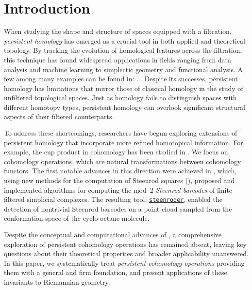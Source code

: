 
\section{Introduction} \label{s:introduction}

When studying the shape and structure of spaces equipped with a filtration, \textit{persistent homology} has emerged as a crucial tool in both applied and theoretical topology.
By tracking the evolution of homological features across the filtration, this technique has found widespread applications in fields ranging from data analysis and machine learning to simplectic geometry and functional analysis.
A few among many examples can be found in: ...
Despite its successes, persistent homology has limitations that mirror those of classical homology in the study of unfiltered topological spaces.
Just as homology fails to distinguish spaces with different homotopy types, persistent homology can overlook significant structural aspects of their filtered counterparts.

To address these shortcomings, researchers have begun exploring extensions of persistent homology that incorporate more refined homotopical information.
For example, the cup product in cohomology has been studied in \cite{contessoto_et_al:LIPIcs.SoCG.2022.31, memoli2024persistent, huang2005cup, yarmola2010persistence, herscovich2018higher, belchi2021a, contreras2022persistent}.
We focus on cohomology operations, which are natural transformations between cohomology functors.
The first notable advances in this direction were achieved in \cite{medina2022per_st}, which, using new methods for the computation of Steenrod squares (\cite{medina2023fast_sq}), proposed and implemented algorithms for computing the mod~2 \textit{Steenrod barcodes} of finite filtered simplicial complexes.
The resulting tool, \href{https://steenroder.github.io/steenroder/}{\texttt{steenroder}}, enabled the detection of nontrivial Steenrod barcodes on a point cloud sampled from the conformation space of the cyclo-octane molecule.

Despite the conceptual and computational advances of \cite{medina2022per_st}, a comprehensive exploration of persistent cohomology operations has remained absent, leaving key questions about their theoretical properties and broader applicability unanswered.
In this paper, we systematically treat \textit{persistent cohomology operations} providing them with a general and firm foundation, and present applications of these invariants to Riemannian geometry.

